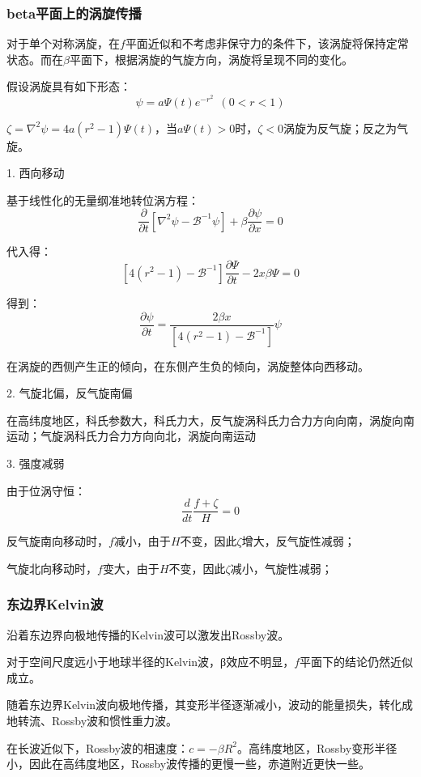 \documentclass{article}
\begin{document}
\subsubsection{beta平面上的涡旋传播}
对于单个对称涡旋，在$f$平面近似和不考虑非保守力的条件下，该涡旋将保持定常状态。而在$\beta$平面下，根据涡旋的气旋方向，涡旋将呈现不同的变化。

假设涡旋具有如下形态：
$$\psi = a\Psi(t)e^{-r^2} \ \ (0<r<1)$$

$\zeta={{\nabla }}^{2}{{\psi }} = 4a(r^2-1)\Psi(t)$，当$a\Psi(t)>0$时，$\zeta<0$涡旋为反气旋；反之为气旋。

1. 西向移动

基于线性化的无量纲准地转位涡方程：
$$\frac{\partial }{\partial {{t}}}\left[ {{\nabla }}^{2}{{\psi }}-{\mathcal{B}^{-1}}{{\psi }} \right]+{{\beta }}\frac{\partial {{\psi }}}{\partial {{x}}}=0$$

代入得：
$$\left[ 4({{r}^{2}}-1)-{{\mathcal{B}}^{-1}} \right]\frac{\partial \Psi }{\partial t}-2x\beta \Psi =0$$

得到：
$$\frac{\partial \psi }{\partial t}=\frac{2\beta x}{\left[ 4({{r}^{2}}-1)-{{\mathcal{B}}^{-1}} \right]}\psi$$

在涡旋的西侧产生正的倾向，在东侧产生负的倾向，涡旋整体向西移动。

2. 气旋北偏，反气旋南偏 

在高纬度地区，科氏参数大，科氏力大，反气旋涡科氏力合力方向向南，涡旋向南运动；气旋涡科氏力合力方向向北，涡旋向南运动

3. 强度减弱

由于位涡守恒：
$$\frac{d}{dt}\frac{f+\zeta}{H}=0$$

反气旋南向移动时，$f$减小，由于$H$不变，因此$\zeta$增大，反气旋性减弱；

气旋北向移动时，$f$变大，由于$H$不变，因此$\zeta$减小，气旋性减弱；

\subsubsection{东边界Kelvin波}
沿着东边界向极地传播的Kelvin波可以激发出Rossby波。

对于空间尺度远小于地球半径的Kelvin波，β效应不明显，$f$平面下的结论仍然近似成立。

随着东边界Kelvin波向极地传播，其变形半径逐渐减小，波动的能量损失，转化成地转流、Rossby波和惯性重力波。

在长波近似下，Rossby波的相速度：$c=-\beta R^2$。高纬度地区，Rossby变形半径小，因此在高纬度地区，Rossby波传播的更慢一些，赤道附近更快一些。
\end{document}
